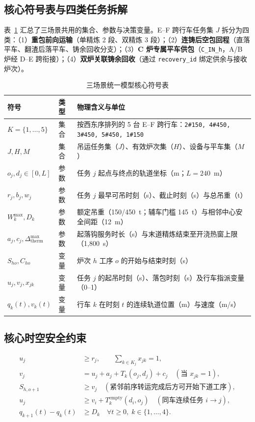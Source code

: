 \documentclass[11pt,a4paper,UTF8]{ctexart}
\begin{document}
\subsection{核心符号表与四类任务拆解}
表~\ref{tab:nomenclature} 汇总了三场景共用的集合、参数与决策变量。E--F 跨行车任务集 $J$ 拆分为四类：（1）\textbf{重包前向运输}（单精炼 2 段、双精炼 3 段）；（2）\textbf{连铸后空包回程}（直落平车、翻渣后落平车、铸余回收分支）；（3）\textbf{C 炉专属平车供包}（\texttt{C\_IN\_h}，A/B 炉经 D--E 跨衔接）；（4）\textbf{双炉关联铸余回收}（通过 \texttt{recovery\_id} 绑定供余与接收炉次）。

\begin{table}[htbp]
\centering
\small
\caption{三场景统一模型核心符号表}
\label{tab:nomenclature}
\begin{tabular}{llp{8.4cm}}
\toprule
\textbf{符号} & \textbf{类型} & \textbf{物理含义与单位} \\
\midrule
$K = \{1,\dots,5\}$ & 集合 & 按西东序排列的 5 台 E--F 跨行车：\texttt{2\#150, 4\#450, 3\#450, 5\#450, 1\#150} \\
$J, H, M$ & 集合 & 吊运任务集（$J$）、有效炉次集（$H$）、设备与平车集（$M$） \\
$o_j, d_j \in [0, L]$ & 参数 & 任务 $j$ 起点与终点的轨道坐标（m；$L=240$~m） \\
$r_j, b_j, w_j$ & 参数 & 任务 $j$ 最早可吊时刻（s）、截止时刻（s）与总吊重（t） \\
$W_k^{\max}, D_k$ & 参数 & 额定吊重（150/450~t；辅车门槛 145~t）与相邻中心安全间距（12~m） \\
$a_j, c_j, \Delta_{\text{therm}}^{\max}$ & 参数 & 起落钩服务时长（s）与末道精炼结束至开浇热窗上限（1,800~s） \\
$S_{ho}, C_{ho}$ & 变量 & 炉次 $h$ 工序 $o$ 的开始与结束时刻（s） \\
$u_j, v_j, x_{jk}$ & 变量 & 任务 $j$ 的起吊时刻（s）、落包时刻（s）及行车指派变量（0--1） \\
$q_k(t), v_k(t)$ & 变量 & 行车 $k$ 在时刻 $t$ 的连续轨道位置（m）与速度（m/s） \\
\bottomrule
\end{tabular}
\end{table}

\subsection{核心时空安全约束}
\begin{align}
  u_j &\ge r_j, \qquad \sum_{k \in K_j} x_{jk} = 1, \\
  v_j &= u_j + a_j + T_k(o_j, d_j) + c_j \quad (\text{当 } x_{jk} = 1), \\
  S_{h,o+1} &\ge v_j \quad (\text{紧邻前序转运完成后方可开始下道工序}), \\
  u_j &\ge v_i + T_k^{\text{empty}}(d_i, o_j) \quad (\text{同车连续任务 } i \to j), \\
  q_{k+1}(t) - q_k(t) &\ge D_k \quad \forall t \ge 0,\; k \in \{1,\dots,4\}.
\end{align}
\end{document}
